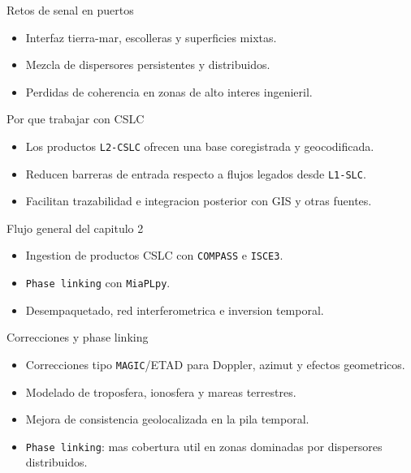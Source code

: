 \documentclass[aspectratio=169]{beamer}
\begin{document}
\begin{frame}{Retos de senal en puertos}
  \begin{itemize}
    \item Interfaz tierra-mar, escolleras y superficies mixtas.
    \item Mezcla de dispersores persistentes y distribuidos.
    \item Perdidas de coherencia en zonas de alto interes ingenieril.
  \end{itemize}
\end{frame}

\begin{frame}{Por que trabajar con CSLC}
  \begin{itemize}
    \item Los productos \texttt{L2-CSLC} ofrecen una base coregistrada y geocodificada.
    \item Reducen barreras de entrada respecto a flujos legados desde \texttt{L1-SLC}.
    \item Facilitan trazabilidad e integracion posterior con GIS y otras fuentes.
  \end{itemize}
\end{frame}

\begin{frame}{Flujo general del capitulo 2}
  \begin{itemize}
    \item Ingestion de productos CSLC con \texttt{COMPASS} e \texttt{ISCE3}.
    \item \texttt{Phase linking} con \texttt{MiaPLpy}.
    \item Desempaquetado, red interferometrica e inversion temporal.
  \end{itemize}
\end{frame}

\begin{frame}{Correcciones y phase linking}
  \begin{itemize}
    \item Correcciones tipo \texttt{MAGIC}/ETAD para Doppler, azimut y efectos geometricos.
    \item Modelado de troposfera, ionosfera y mareas terrestres.
    \item Mejora de consistencia geolocalizada en la pila temporal.
    \item \texttt{Phase linking}: mas cobertura util en zonas dominadas por dispersores distribuidos.
  \end{itemize}
\end{frame}
\end{document}

